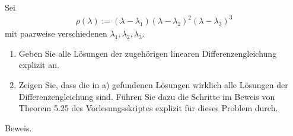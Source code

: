 \begin{exercise}
Sei
\begin{align}
  \rho(\lambda) := (\lambda - \lambda_1)(\lambda - \lambda_2)^2(\lambda - \lambda_3)^3
\end{align}
mit paarweise verschiedenen $\lambda_1,\lambda_2,\lambda_3$.
\begin{enumerate}[label = \textbf{\alph*}]
  \item Geben Sie alle Lösungen der zugehörigen linearen Differenzengleichung explizit an.
  \item Zeigen Sie, dass die in a) gefundenen Lösungen wirklich alle Lösungen
  der Differenzengleichung sind. Führen Sie dazu die Schritte im Beweis von
  Theorem 5.25 des Vorlesungsskriptes explizit für dieses Problem durch.
\end{enumerate}
\end{exercise}
\begin{solution}
Beweis.
\end{solution}

